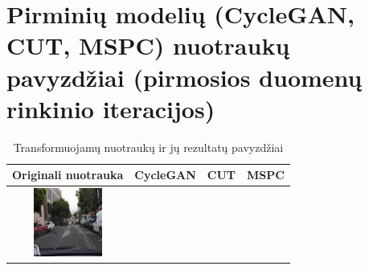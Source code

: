 \documentclass{VUMIFPSbakalaurinis}
\begin{document}
\section{Pirminių modelių (CycleGAN, CUT, MSPC) nuotraukų pavyzdžiai (pirmosios duomenų rinkinio iteracijos)}
    \begin{table}[H]
        \footnotesize
        \centering
        \caption{Transformuojamų nuotraukų ir jų rezultatų pavyzdžiai}
        {\begin{tabular}{|c|c|c|c|} \hline
            Originali nuotrauka & CycleGAN  & CUT  & MSPC\\
            \hline
            \includegraphics[width=100,height=85]{img/pvz/1_real} & 

\end{tabular}}
\end{table}
\end{document}
